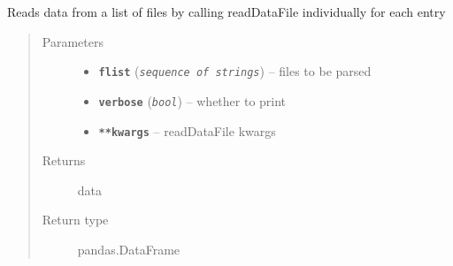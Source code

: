\documentclass[a4paper,10pt,oneside]{sphinxmanual}
\begin{document}
\begin{fulllineitems}
\label{pymicra:pymicra.io.readDataFiles}
Reads data from a list of files by calling readDataFile individually for each entry
\begin{quote}\begin{description}
\item[{Parameters}] \leavevmode\begin{itemize}
\item {} 
\textbf{\texttt{flist}} (\emph{\texttt{sequence of strings}}) -- files to be parsed

\item {} 
\textbf{\texttt{verbose}} (\emph{\texttt{bool}}) -- whether to print

\item {} 
\textbf{\texttt{**kwargs}} -- readDataFile kwargs

\end{itemize}

\item[{Returns}] \leavevmode
data

\item[{Return type}] \leavevmode
pandas.DataFrame

\end{description}\end{quote}

\end{fulllineitems}

\end{document}
